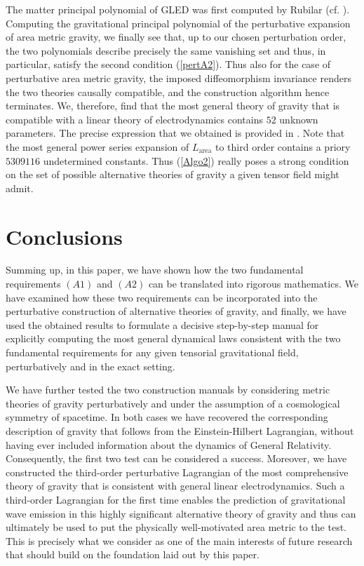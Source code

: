 \documentclass[%
preprint,
titlepage,
nofootinbib,
amsmath,amssymb,
showkeys,
aps,
prd,
floatfix,
]{revtex4-2}
\begin{document}
The matter principal polynomial of GLED was first computed by Rubilar (cf. \cite{2009JPhA...42U5402I}).
Computing the gravitational principal polynomial of the perturbative expansion of area metric gravity, we finally see that, up to our chosen perturbation order, the two polynomials describe precisely the same vanishing set and thus, in particular, satisfy the second condition (\ref{pertA2}). 
Thus also for the case of perturbative area metric gravity, the imposed diffeomorphism invariance renders the two theories causally compatible, and the construction algorithm hence terminates. 
We, therefore, find that the most general theory of gravity that is compatible with a linear theory of electrodynamics contains $52$ unknown parameters. The precise expression that we obtained is provided in \cite{TobiMaster}.
Note that the most general power series expansion of $L_{\text{area}}$ to third order contains a priory $5309116$ undetermined constants. Thus (\ref{Algo2}) really poses a strong condition on the set of possible alternative theories of gravity a given tensor field might admit. 
\section{Conclusions}
Summing up, in this paper, we have shown how the two fundamental requirements $(A1)$ and $(A2)$ can be translated into rigorous mathematics. We have examined how these two requirements can be incorporated into the perturbative construction of alternative theories of gravity, and finally, we have used the obtained results to formulate a decisive step-by-step manual for explicitly computing the most general dynamical laws consistent with the two fundamental requirements for any given tensorial gravitational field, perturbatively and in the exact setting.  

We have further tested the two construction manuals by considering metric theories of gravity perturbatively and under the assumption of a cosmological symmetry of spacetime. In both cases we have recovered the corresponding description of gravity that follows from the Einstein-Hilbert Lagrangian, without having ever included information about the dynamics of General Relativity. Consequently, the first two test can be considered a success.
Moreover, we have constructed the third-order perturbative Lagrangian of the most comprehensive theory of gravity that is consistent with general linear electrodynamics. Such a third-order Lagrangian for the first time enables the prediction of gravitational wave emission in this highly significant alternative theory of gravity and thus can ultimately be used to put the physically well-motivated area metric to the test. This is precisely what we consider as one of the main interests of future research that should build on the foundation laid out by this paper.  



\end{document}
